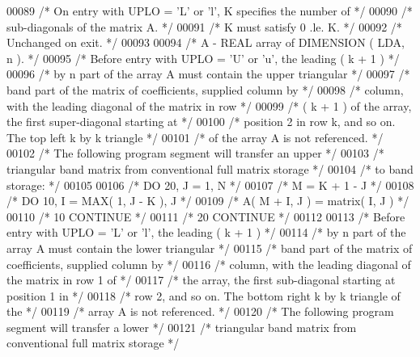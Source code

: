 \begin{DoxyCode}
00089 \textcolor{comment}{/*           On entry with UPLO = 'L' or 'l', K specifies the number of */}
00090 \textcolor{comment}{/*           sub-diagonals of the matrix A. */}
00091 \textcolor{comment}{/*           K must satisfy  0 .le. K. */}
00092 \textcolor{comment}{/*           Unchanged on exit. */}
00093 
00094 \textcolor{comment}{/*  A      - REAL             array of DIMENSION ( LDA, n ). */}
00095 \textcolor{comment}{/*           Before entry with UPLO = 'U' or 'u', the leading ( k + 1 ) */}
00096 \textcolor{comment}{/*           by n part of the array A must contain the upper triangular */}
00097 \textcolor{comment}{/*           band part of the matrix of coefficients, supplied column by */}
00098 \textcolor{comment}{/*           column, with the leading diagonal of the matrix in row */}
00099 \textcolor{comment}{/*           ( k + 1 ) of the array, the first super-diagonal starting at */}
00100 \textcolor{comment}{/*           position 2 in row k, and so on. The top left k by k triangle */}
00101 \textcolor{comment}{/*           of the array A is not referenced. */}
00102 \textcolor{comment}{/*           The following program segment will transfer an upper */}
00103 \textcolor{comment}{/*           triangular band matrix from conventional full matrix storage */}
00104 \textcolor{comment}{/*           to band storage: */}
00105 
00106 \textcolor{comment}{/*                 DO 20, J = 1, N */}
00107 \textcolor{comment}{/*                    M = K + 1 - J */}
00108 \textcolor{comment}{/*                    DO 10, I = MAX( 1, J - K ), J */}
00109 \textcolor{comment}{/*                       A( M + I, J ) = matrix( I, J ) */}
00110 \textcolor{comment}{/*              10    CONTINUE */}
00111 \textcolor{comment}{/*              20 CONTINUE */}
00112 
00113 \textcolor{comment}{/*           Before entry with UPLO = 'L' or 'l', the leading ( k + 1 ) */}
00114 \textcolor{comment}{/*           by n part of the array A must contain the lower triangular */}
00115 \textcolor{comment}{/*           band part of the matrix of coefficients, supplied column by */}
00116 \textcolor{comment}{/*           column, with the leading diagonal of the matrix in row 1 of */}
00117 \textcolor{comment}{/*           the array, the first sub-diagonal starting at position 1 in */}
00118 \textcolor{comment}{/*           row 2, and so on. The bottom right k by k triangle of the */}
00119 \textcolor{comment}{/*           array A is not referenced. */}
00120 \textcolor{comment}{/*           The following program segment will transfer a lower */}
00121 \textcolor{comment}{/*           triangular band matrix from conventional full matrix storage */}

\end{DoxyCode}
